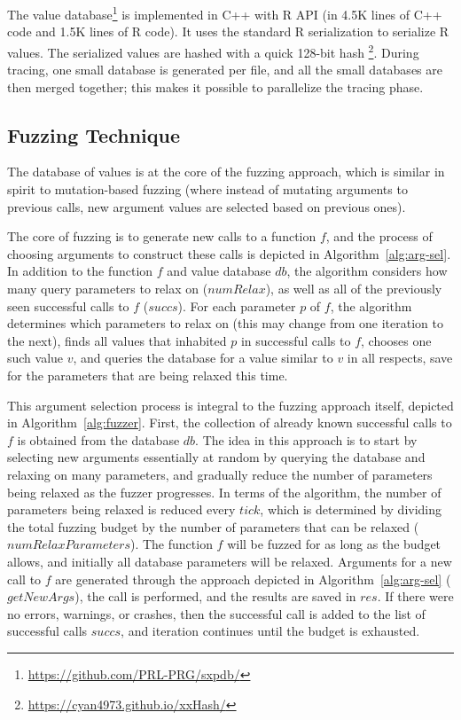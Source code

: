 \documentclass[sigplan,anonymous,review]{acmart}
\begin{document}
The value database\footnote{\url{https://github.com/PRL-PRG/sxpdb/}  } is implemented in C++ with R API (in 4.5K lines of C++ code and 1.5K lines of R code).
It uses the standard R serialization to serialize R values. 
The serialized values are hashed with a quick 128-bit hash \footnote{\url{https://cyan4973.github.io/xxHash/}}. 
During tracing, one small database is generated per file, and all the small databases are then merged together; this makes it possible to parallelize the tracing phase.

\subsection{Fuzzing Technique }

The database of values is at the core of the fuzzing approach, which is similar in spirit to mutation-based fuzzing (where instead of mutating arguments to previous calls, new argument values are selected based on previous ones).

The core of fuzzing is to generate new calls to a function $f$, and the process of choosing arguments to construct these calls is depicted in Algorithm~\ref{alg:arg-sel}.
In addition to the function $f$ and value database $db$, the algorithm considers how many query parameters to relax on ($numRelax$), as well as all of the previously seen successful calls to $f$ ($succs$).
For each parameter $p$ of $f$, the algorithm determines which parameters to relax on (this may change from one iteration to the next), finds all values that inhabited $p$ in successful calls to $f$, chooses one such value $v$, and queries the database for a value similar to $v$ in all respects, save for the parameters that are being relaxed this time.

This argument selection process is integral to the fuzzing approach itself, depicted in Algorithm~\ref{alg:fuzzer}.
First, the collection of already known successful calls to $f$ is obtained from the database $db$.
The idea in this approach is to start by selecting new arguments essentially at random by querying the database and relaxing on many parameters, and gradually reduce the number of parameters being relaxed as the fuzzer progresses.
In terms of the algorithm, the number of parameters being relaxed is reduced every $tick$, which is determined by dividing the total fuzzing budget by the number of parameters that can be relaxed ($numRelaxParameters$).
The function $f$ will be fuzzed for as long as the budget allows, and initially all database parameters will be relaxed.
Arguments for a new call to $f$ are generated through the approach depicted in Algorithm~\ref{alg:arg-sel} ($getNewArgs$), the call is performed, and the results are saved in $res$.
If there were no errors, warnings, or crashes, then the successful call is added to the list of successful calls $succs$, and iteration continues until the budget is exhausted.
\end{document}
